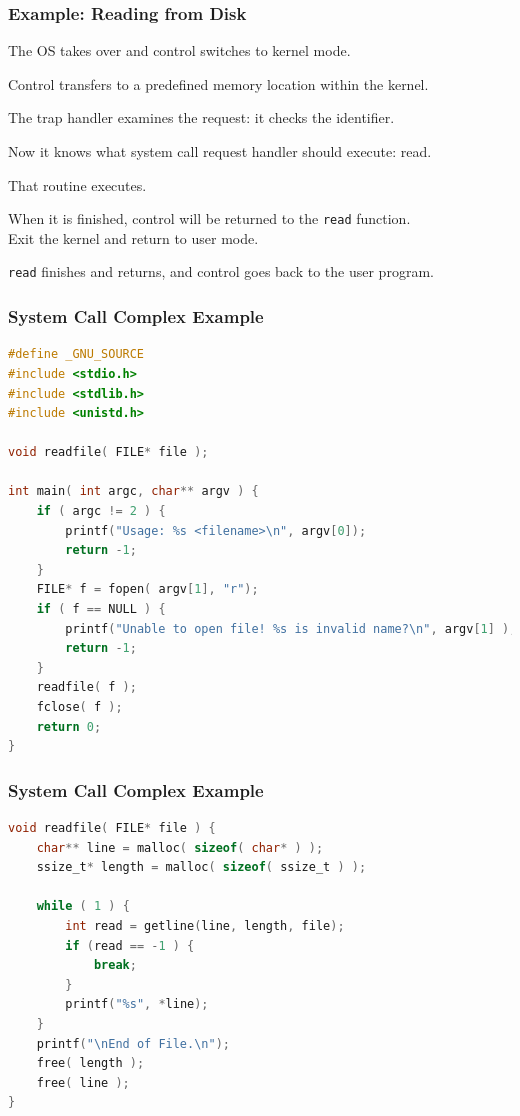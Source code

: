 \begin{frame}
\frametitle{Example: Reading from Disk}


The OS takes over and control switches to kernel mode. 

Control transfers to a predefined memory location within the kernel. 

The trap handler examines the request: it checks the identifier. 

Now it knows what system call request handler should execute: read. 

That routine executes. 

When it is finished, control will be returned to the \texttt{read} function.\\
\quad Exit the kernel and return to user mode.

\texttt{read} finishes and returns, and control goes back to the user program.


\end{frame}


\begin{frame}[fragile]
\frametitle{System Call Complex Example}

\begin{lstlisting}[language=C]
#define _GNU_SOURCE
#include <stdio.h>
#include <stdlib.h>
#include <unistd.h>

void readfile( FILE* file );

int main( int argc, char** argv ) {
    if ( argc != 2 ) {
        printf("Usage: %s <filename>\n", argv[0]);
        return -1;
    }
    FILE* f = fopen( argv[1], "r");
    if ( f == NULL ) {
        printf("Unable to open file! %s is invalid name?\n", argv[1] );
        return -1;
    }
    readfile( f );
    fclose( f );
    return 0;
}
\end{lstlisting}
\end{frame}

\begin{frame}[fragile]
\frametitle{System Call Complex Example}

\begin{lstlisting}[language=C]
void readfile( FILE* file ) {
    char** line = malloc( sizeof( char* ) );
    ssize_t* length = malloc( sizeof( ssize_t ) );
    
    while ( 1 ) {
        int read = getline(line, length, file);
        if (read == -1 ) {
            break;
        }
        printf("%s", *line);
    }
    printf("\nEnd of File.\n");
    free( length );
    free( line );
}
\end{lstlisting}


\end{frame}


